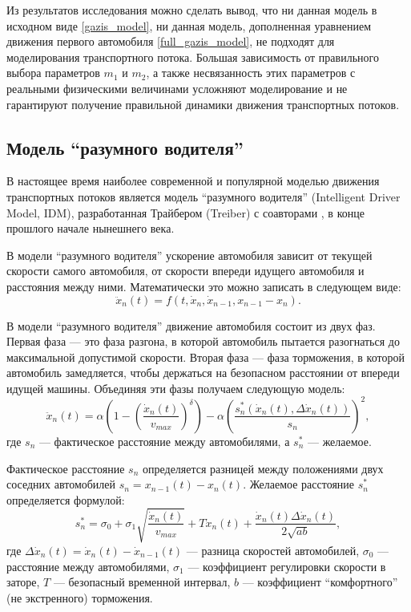 \documentclass[12pt, a4paper]{extarticle}
\numberwithin{equation}{section}
\numberwithin{figure}{section}
\begin{document}
Из результатов исследования можно сделать вывод, что ни данная модель в исходном виде \eqref{gazis_model}, ни данная модель, дополненная уравнением движения первого автомобиля \eqref{full_gazis_model}, не подходят для моделирования транспортного потока. Большая зависимость от правильного выбора параметров $m_1$ и $m_2$, а также несвязанность этих параметров с реальными физическими величинами усложняют моделирование и не гарантируют получение правильной динамики движения транспортных потоков. 

\subsection{Модель ``разумного водителя''}
В настоящее время наиболее современной и популярной моделью движения транспортных потоков является модель ``разумного водителя'' (Intelligent Driver Model, IDM), разработанная Трайбером (Treiber) с соавторами \cite{TreiberModel_1}, \cite{TreiberModel_2} в конце прошлого начале нынешнего века. 

В модели ``разумного водителя'' ускорение автомобиля зависит от текущей скорости самого автомобиля, от скорости впереди идущего автомобиля и расстояния между ними. Математически это можно записать в следующем виде:
\begin{equation*}
\ddot{x}_n(t)=f(t, \dot{x}_n,\dot{x}_{n-1}, x_{n-1}-x_n).
\end{equation*} 

В модели ``разумного водителя'' движение автомобиля состоит из двух фаз. Первая фаза --- это фаза разгона, в которой автомобиль пытается разогнаться до максимальной допустимой скорости. Вторая фаза --- фаза торможения, в которой автомобиль замедляется, чтобы держаться на безопасном расстоянии от впереди идущей машины. Объединяя эти фазы получаем следующую модель:
\begin{equation} \label{treiber_model}
\ddot{x}_n(t)= \alpha\left( 1-\left( \dfrac{\dot{x}_n(t)}{v_{max}}\right)^\delta \right) - \alpha\left( \dfrac{s^*_n(\dot{x}_n(t),\Delta \dot{x}_n(t))}{s_n}\right)^2,
\end{equation}
где $s_n$ --- фактическое расстояние между автомобилями, а $s^*_n$ --- желаемое.

Фактическое расстояние $s_n$ определяется разницей между положениями двух соседних автомобилей $s_n=x_{n-1}(t)-x_n(t)$. Желаемое расстояние  $s^*_n$ определяется формулой:
\begin{equation*}
s^*_n = \sigma_0+\sigma_1\sqrt{\dfrac{ \dot{x}_n(t)}{v_{max}}} +T \dot{x}_n(t)+ \dfrac{ \dot{x}_n(t)\Delta \dot{x}_n(t) }{2\sqrt{ab}},
\end{equation*}
где $\Delta \dot{x}_n(t) = \dot{x}_n(t)- \dot{x}_{n-1}(t)$ --- разница скоростей автомобилей, $\sigma_0$ --- расстояние между автомобилями, $\sigma_1$ --- коэффициент регулировки скорости в заторе, $T$ --- безопасный временной интервал, $b$ --- коэффициент ``комфортного'' (не экстренного) торможения.
\end{document}
